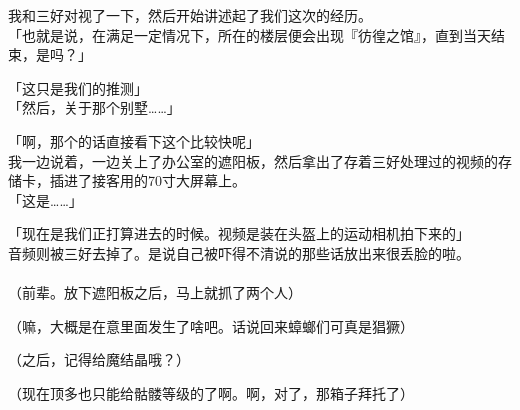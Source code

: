 我和三好对视了一下，然后开始讲述起了我们这次的经历。\\

「也就是说，在满足一定情况下，所在的楼层便会出现『彷徨之馆』，直到当天结束，是吗？」

「这只是我们的推测」\\

「然后，关于那个别墅……」

「啊，那个的话直接看下这个比较快呢」\\

我一边说着，一边关上了办公室的遮阳板，然后拿出了存着三好处理过的视频的存储卡，插进了接客用的70寸大屏幕上。\\

「这是……」

「现在是我们正打算进去的时候。视频是装在头盔上的运动相机拍下来的」\\

音频则被三好去掉了。是说自己被吓得不清说的那些话放出来很丢脸的啦。\\

\sqsplit\\

（前辈。放下遮阳板之后，马上就抓了两个人）

（嘛，大概是在意里面发生了啥吧。话说回来蟑螂们可真是猖獗）

（之后，记得给魔结晶哦？）

（现在顶多也只能给骷髅等级的了啊。啊，对了，那箱子拜托了）

